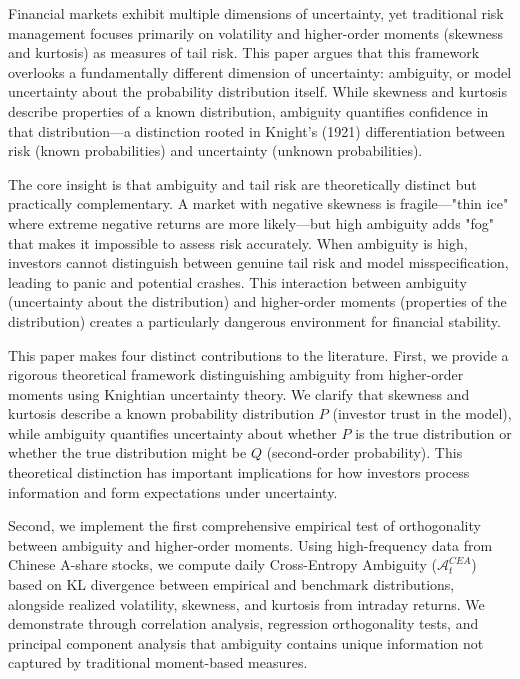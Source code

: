 \documentclass[preprint,12pt,authoryear]{elsarticle}
\begin{document}
Financial markets exhibit multiple dimensions of uncertainty, yet traditional risk management focuses primarily on volatility and higher-order moments (skewness and kurtosis) as measures of tail risk. This paper argues that this framework overlooks a fundamentally different dimension of uncertainty: ambiguity, or model uncertainty about the probability distribution itself. While skewness and kurtosis describe properties of a known distribution, ambiguity quantifies confidence in that distribution—a distinction rooted in Knight's (1921) differentiation between risk (known probabilities) and uncertainty (unknown probabilities).

The core insight is that ambiguity and tail risk are theoretically distinct but practically complementary. A market with negative skewness is fragile—"thin ice" where extreme negative returns are more likely—but high ambiguity adds "fog" that makes it impossible to assess risk accurately. When ambiguity is high, investors cannot distinguish between genuine tail risk and model misspecification, leading to panic and potential crashes. This interaction between ambiguity (uncertainty about the distribution) and higher-order moments (properties of the distribution) creates a particularly dangerous environment for financial stability.

This paper makes four distinct contributions to the literature. First, we provide a rigorous theoretical framework distinguishing ambiguity from higher-order moments using Knightian uncertainty theory. We clarify that skewness and kurtosis describe a known probability distribution $P$ (investor trust in the model), while ambiguity quantifies uncertainty about whether $P$ is the true distribution or whether the true distribution might be $Q$ (second-order probability). This theoretical distinction has important implications for how investors process information and form expectations under uncertainty.

Second, we implement the first comprehensive empirical test of orthogonality between ambiguity and higher-order moments. Using high-frequency data from Chinese A-share stocks, we compute daily Cross-Entropy Ambiguity ($\mathcal{A}^{CEA}_t$) based on KL divergence between empirical and benchmark distributions, alongside realized volatility, skewness, and kurtosis from intraday returns. We demonstrate through correlation analysis, regression orthogonality tests, and principal component analysis that ambiguity contains unique information not captured by traditional moment-based measures.
\end{document}
